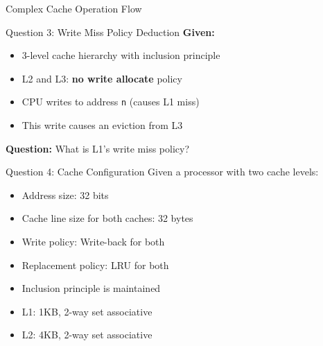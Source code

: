 \documentclass[aspectratio=169,12pt]{beamer}
\begin{document}
\begin{frame}{Complex Cache Operation Flow}
\begin{center}
\end{center}
\end{frame}

\begin{frame}{Question 3: Write Miss Policy Deduction}
\textbf{Given:}
\begin{itemize}
    \item 3-level cache hierarchy with inclusion principle
    \item L2 and L3: \textbf{no write allocate} policy
    \item CPU writes to address \texttt{n} (causes L1 miss)
    \item This write causes an eviction from L3
\end{itemize}

\vspace{0.4cm}
\textbf{Question:} What is L1's write miss policy?

\vspace{0.4cm}
\end{frame}

\begin{frame}{Question 4: Cache Configuration}
Given a processor with two cache levels:
\begin{itemize}
    \item Address size: 32 bits
    \item Cache line size for both caches: 32 bytes
    \item Write policy: Write-back for both
    \item Replacement policy: LRU for both
    \item Inclusion principle is maintained
    \item L1: 1KB, 2-way set associative
    \item L2: 4KB, 2-way set associative
\end{itemize}
\end{frame}
\end{document}

